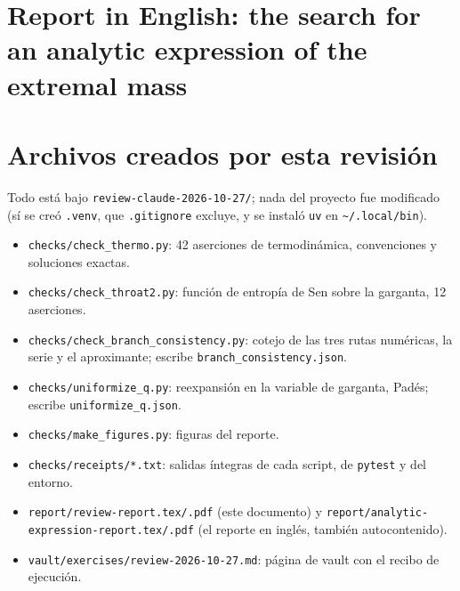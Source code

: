 \documentclass[10pt,a4paper]{article}
\newcommand{\code}[1]{\texttt{#1}}
\begin{document}
\clearpage
\section{Report in English: the search for an analytic expression of the extremal mass}
\label{sec:english}


\clearpage
\appendix
\section{Archivos creados por esta revisión}

Todo está bajo \code{review-claude-2026-10-27/}; nada del proyecto fue modificado (sí se creó
\code{.venv}, que \code{.gitignore} excluye, y se instaló \code{uv} en \code{\textasciitilde/.local/bin}).
\begin{itemize}[nosep]
\item \code{checks/check\_thermo.py}: 42 aserciones de termodinámica, convenciones y soluciones exactas.
\item \code{checks/check\_throat2.py}: función de entropía de Sen sobre la garganta, 12 aserciones.
\item \code{checks/check\_branch\_consistency.py}: cotejo de las tres rutas numéricas, la serie y el
 aproximante; escribe \code{branch\_consistency.json}.
\item \code{checks/uniformize\_q.py}: reexpansión en la variable de garganta, Padés; escribe
 \code{uniformize\_q.json}.
\item \code{checks/make\_figures.py}: figuras del reporte.
\item \code{checks/receipts/*.txt}: salidas íntegras de cada script, de \code{pytest} y del entorno.
\item \code{report/review-report.tex/.pdf} (este documento) y
 \code{report/analytic-expression-report.tex/.pdf} (el reporte en inglés, también autocontenido).
\item \code{vault/exercises/review-2026-10-27.md}: página de vault con el recibo de ejecución.
\end{itemize}
\end{document}
